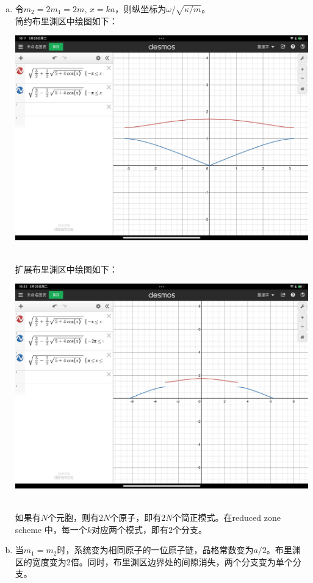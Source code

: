 \documentclass[reqno,a4paper,12pt]{amsart}
\begin{document}
\begin{tcolorbox}[breakable, colback = black!5!white, colframe = black]
\begin{enumerate}[(a)]
\item 令$m_2 = 2m_1 = 2m$, $x = ka$，则纵坐标为$\omega/\sqrt{\kappa/m}$。 \\
简约布里渊区中绘图如下：\\
\begin{centering}
	\includegraphics[scale=0.17]{reduced10.1.jpg}
\end{centering}\\
扩展布里渊区中绘图如下：\\
\begin{centering}
	\includegraphics[scale=0.17]{extended10.1.jpg}
\end{centering}\\
如果有$N$个元胞，则有$2N$个原子，即有$2N$个简正模式。在reduced zone scheme 中，每一个$k$对应两个模式，即有$2$个分支。

\item 当$m_1 = m_2$时，系统变为相同原子的一位原子链，晶格常数变为$a/2$。布里渊区的宽度变为2倍。同时，布里渊区边界处的间隙消失，两个分支变为单个分支。
\end{enumerate}
\end{tcolorbox}
\end{document}

